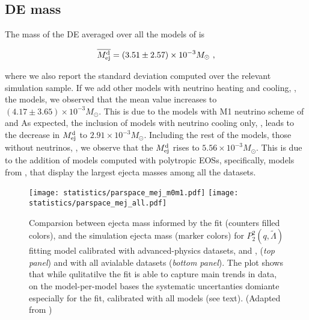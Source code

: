 
\subsection{\ac{DE} mass}

The mass of the \ac{DE} averaged over all the models of \DSrefset{} is 

\begin{equation}
\label{eq:ejecta:dyn:avg:M}
\overline{M^{\text{d}}_{\text{ej}}} = (3.51 \pm 2.57)\times 10^{-3}M_{\odot}\ ,
\end{equation}

where we also report the standard deviation computed over the relevant simulation sample.
If we add other models with neutrino heating and cooling, \ie, the \DSheatcool{} models,
we observed that the mean value increases to $(4.17 \pm 3.65)\times 10^{-3}M_{\odot}$.
This is due to the models with M1 neutrino scheme of \citet{Vincent:2019kor} and \citet{Sekiguchi:2016bjd}
As expected, the inclusion of models with neutrino cooling only, \DScool{}, leads to the decrease in 
$M^{\text{d}}_{\text{ej}}$ to $2.91\times 10^{-3}M_{\odot}$.
Including the rest of the models, those without neutrinos, \DSnone{}, we observe that the 
$M^{\text{d}}_{\text{ej}}$ rises to $5.56\times 10^{-3}M_{\odot}$. This is due to the addition of models computed with
polytropic \acp{EOS}, specifically, models from \citet{Dietrich:2016hky}, that display 
the largest ejecta masses among all the datasets.

\begin{figure}[t]
    \centering 
    \texttt{[image: statistics/parspace\_mej\_m0m1.pdf]}
    \texttt{[image: statistics/parspace\_mej\_all.pdf]}
    \caption{
        Comparsion between ejecta mass informed by the fit (counters filled colors), 
        and the simulation ejecta mass (marker colors) for $P_2^2(q,\tilde{\Lambda})$ 
        fitting model calibrated with advanced-physics datasets, 
        \DSrefset{} and \DSheatcool{}, (\textit{top panel}) and with all 
        avialable datasets (\textit{bottom panel}).
        The plot shows that while qulitatilve the fit is able to capture main trends 
        in data, on the model-per-model bases the systematic uncertanties domiante 
        especially for the fit, calibrated with all models (see text).
        (Adapted from \citet{Nedora:2020qtd})
    }
    \label{fig:mej_parspace}
\end{figure}

